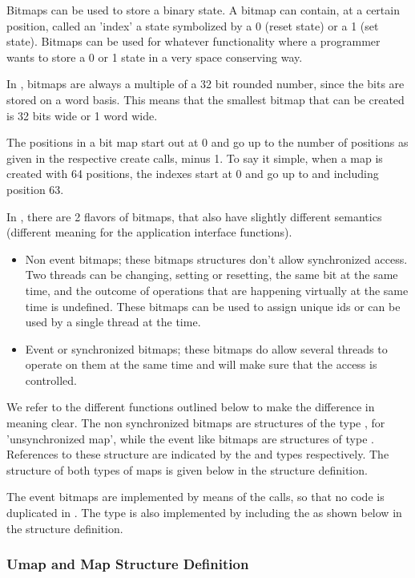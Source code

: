 Bitmaps can be used to store a binary state. A bitmap can contain, at a
certain position, called an 'index' a state symbolized by a 0 (reset state)
or a 1 (set state). Bitmaps can be used for whatever functionality where a
programmer wants to store a 0 or 1 state in a very space conserving way.

In \oswald, bitmaps are always a multiple of a 32 bit rounded number, since
the bits are stored on a word basis. This means that the smallest bitmap that
can be created is 32 bits wide or 1 word wide.

The positions in a bit map start out at 0 and go up to the number of
positions as given in the respective create calls, minus 1. To say it
simple, when a map is created with 64 positions, the indexes start at 0 and
go up to and including position 63.

In \oswald, there are 2 flavors of bitmaps, that also have slightly
different semantics (different meaning for the application interface
functions).

\begin{itemize}
\item Non event bitmaps; these bitmaps structures don't allow synchronized
access. Two threads can be changing, setting or resetting, the same bit at
the same time, and the outcome of operations that are happening virtually at
the same time is undefined. These bitmaps can be used to assign unique ids
or can be used by a single thread at the time.
\item Event or synchronized bitmaps; these bitmaps do allow several threads
to operate on them at the same time and \oswald will make sure that the
access is controlled.
\end{itemize}

We refer to the different functions outlined below to make the difference in
meaning clear. The non synchronized bitmaps are structures of the type
, for 'unsynchronized map', while the event like bitmaps are
structures of type . References to these structure are
indicated by the  and  types respectively.
The structure of both types of maps is given below in the structure
definition.

The  event bitmaps are implemented by means of the
 calls, so that no code is duplicated in \oswald. The
 type is also implemented by including the  as
shown below in the structure definition.

\subsubsection{Umap and Map Structure Definition}

